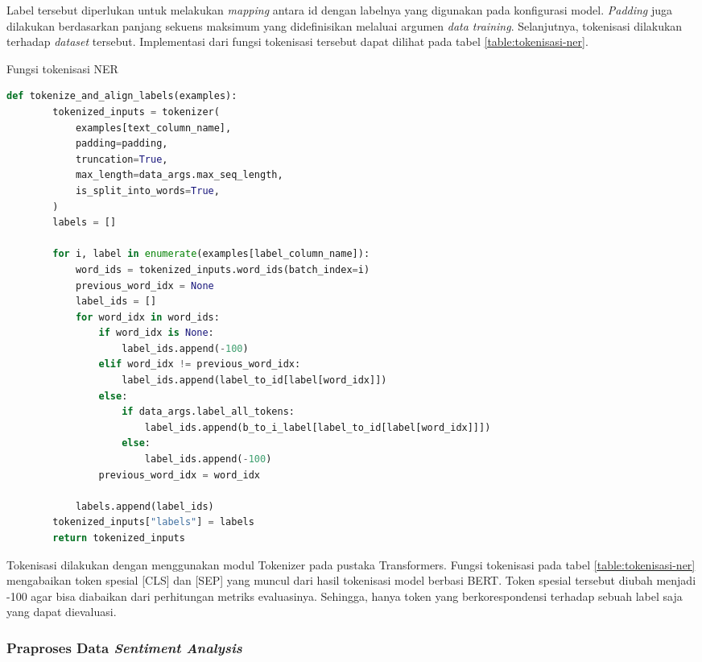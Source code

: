 Label tersebut diperlukan untuk melakukan \textit{mapping} antara id dengan labelnya yang  digunakan pada konfigurasi model. \textit{Padding} juga dilakukan berdasarkan panjang sekuens maksimum yang didefinisikan melaluai argumen \textit{data training}. Selanjutnya, tokenisasi  dilakukan terhadap \textit{dataset} tersebut. Implementasi dari fungsi tokenisasi tersebut dapat dilihat pada tabel \ref{table:tokenisasi-ner}.

\begin{table}[h]
    \caption{Fungsi tokenisasi NER}
    \label{table:tokenisasi-ner}
    \begin{lstlisting}[language=python]
    def tokenize_and_align_labels(examples):
        tokenized_inputs = tokenizer(
            examples[text_column_name],
            padding=padding,
            truncation=True,
            max_length=data_args.max_seq_length,
            is_split_into_words=True,
        )
        labels = []

        for i, label in enumerate(examples[label_column_name]):
            word_ids = tokenized_inputs.word_ids(batch_index=i)
            previous_word_idx = None
            label_ids = []
            for word_idx in word_ids:
                if word_idx is None:
                    label_ids.append(-100)
                elif word_idx != previous_word_idx:
                    label_ids.append(label_to_id[label[word_idx]])
                else:
                    if data_args.label_all_tokens:
                        label_ids.append(b_to_i_label[label_to_id[label[word_idx]]])
                    else:
                        label_ids.append(-100)
                previous_word_idx = word_idx

            labels.append(label_ids)
        tokenized_inputs["labels"] = labels
        return tokenized_inputs
    \end{lstlisting}
\end{table}

Tokenisasi dilakukan dengan menggunakan modul Tokenizer pada pustaka Transformers. Fungsi tokenisasi pada tabel \ref{table:tokenisasi-ner} mengabaikan token spesial [CLS] dan [SEP] yang muncul dari hasil tokenisasi model berbasi BERT. Token spesial tersebut diubah menjadi -100 agar bisa diabaikan dari perhitungan metriks evaluasinya. Sehingga, hanya token yang berkorespondensi terhadap sebuah label saja yang dapat dievaluasi.

\subsubsection{Praproses Data \textit{Sentiment Analysis}}

